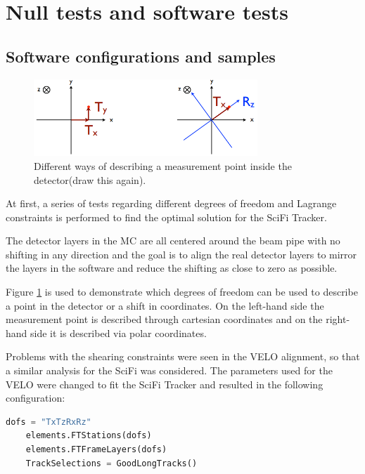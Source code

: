 \section{Null tests and software tests}
\subsection{Software configurations and samples}
\begin{figure}
  \centering
  \includegraphics[width=0.75\textwidth]{plots/point_dofs.png}
  \caption{Different ways of describing a measurement point inside the detector(draw this again).}
  \label{fig:dofs}
\end{figure}

At first, a series of tests regarding different degrees of freedom and Lagrange constraints is performed to find the optimal solution for the SciFi Tracker.

The detector layers in the MC are all centered around the beam pipe with no shifting in any direction and the goal is to align the real detector layers to mirror the layers in the software and reduce the shifting as close to zero as possible.

Figure \ref{fig:dofs} is used to demonstrate which degrees of freedom can be used
to describe a point in the detector or a shift in coordinates.
On the left-hand side the measurement point is described through cartesian coordinates and on the right-hand side it is described via polar coordinates.

Problems with the shearing constraints were seen in the VELO alignment, so that a similar analysis for the SciFi was considered.
The parameters used for the VELO were changed to fit the SciFi Tracker and resulted in the following configuration:

\begin{lstlisting}[language=Python]
    dofs = "TxTzRxRz"
    elements.FTStations(dofs)
    elements.FTFrameLayers(dofs)
    TrackSelections = GoodLongTracks()
\end{lstlisting}

